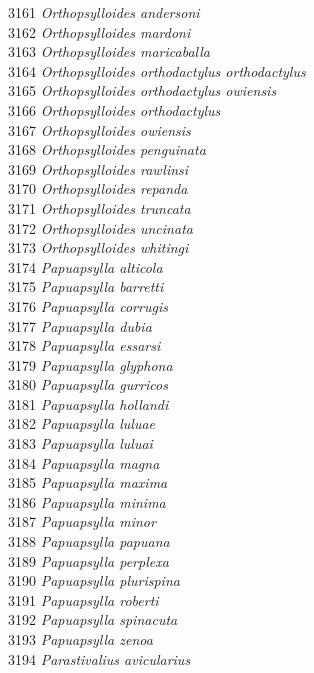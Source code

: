 \documentclass[
]{article}
\begin{document}
3161 \emph{Orthopsylloides andersoni}\\
3162 \emph{Orthopsylloides mardoni}\\
3163 \emph{Orthopsylloides maricaballa}\\
3164 \emph{Orthopsylloides orthodactylus orthodactylus}\\
3165 \emph{Orthopsylloides orthodactylus owiensis}\\
3166 \emph{Orthopsylloides orthodactylus}\\
3167 \emph{Orthopsylloides owiensis}\\
3168 \emph{Orthopsylloides penguinata}\\
3169 \emph{Orthopsylloides rawlinsi}\\
3170 \emph{Orthopsylloides repanda}\\
3171 \emph{Orthopsylloides truncata}\\
3172 \emph{Orthopsylloides uncinata}\\
3173 \emph{Orthopsylloides whitingi}\\
3174 \emph{Papuapsylla alticola}\\
3175 \emph{Papuapsylla barretti}\\
3176 \emph{Papuapsylla corrugis}\\
3177 \emph{Papuapsylla dubia}\\
3178 \emph{Papuapsylla essarsi}\\
3179 \emph{Papuapsylla glyphona}\\
3180 \emph{Papuapsylla gurricos}\\
3181 \emph{Papuapsylla hollandi}\\
3182 \emph{Papuapsylla luluae}\\
3183 \emph{Papuapsylla luluai}\\
3184 \emph{Papuapsylla magna}\\
3185 \emph{Papuapsylla maxima}\\
3186 \emph{Papuapsylla minima}\\
3187 \emph{Papuapsylla minor}\\
3188 \emph{Papuapsylla papuana}\\
3189 \emph{Papuapsylla perplexa}\\
3190 \emph{Papuapsylla plurispina}\\
3191 \emph{Papuapsylla roberti}\\
3192 \emph{Papuapsylla spinacuta}\\
3193 \emph{Papuapsylla zenoa}\\
3194 \emph{Parastivalius avicularius}\\
\end{document}
